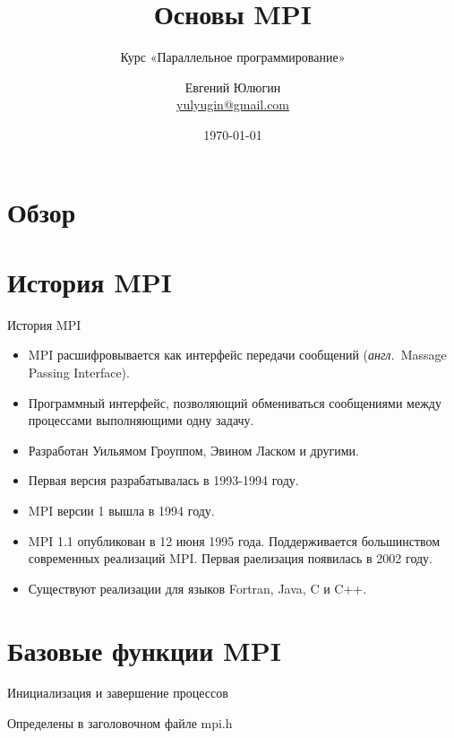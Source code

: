 \documentclass{beamer}
\title{Основы MPI}
\subtitle{Курс «Параллельное программирование»}
\author[Евгений Юлюгин]{Евгений Юлюгин \\ \small{\href{mailto:yulyugin@gmail.com}{yulyugin@gmail.com}}}
\date{\today}
\newcommand{\abbr}{\textit{англ.}\ }
\begin{document}
\begin{frame}
\titlepage
\end{frame}

\section{Обзор}

\begin{frame}
\tableofcontents
\end{frame} 

\section{История MPI}

\begin{frame}{История MPI}

\begin{itemize}
	\item MPI расшифровывается как интерфейс передачи сообщений (\abbr Massage Passing Interface).
	\item Программный интерфейс, позволяющий обмениваться сообщениями между процессами выполняющими одну задачу.
	\item Разработан Уильямом Гроуппом, Эвином Ласком и другими.
	\item Первая версия разрабатывалась в 1993-1994 году.
	\item MPI версии 1 вышла в 1994 году.
	\item MPI 1.1 опубликован в 12 июня 1995 года. Поддерживается большинством современных реализаций MPI. Первая раелизация появилась в 2002 году.
	\item Существуют реализации для языков Fortran, Java, C и C++.
\end{itemize}

\end{frame}

\section{Базовые функции MPI}


\begin{frame}{Инициализация и завершение процессов}

Определены в заголовочном файле mpi.h

\vfill

\initfinalize

\end{frame}
\end{document}
